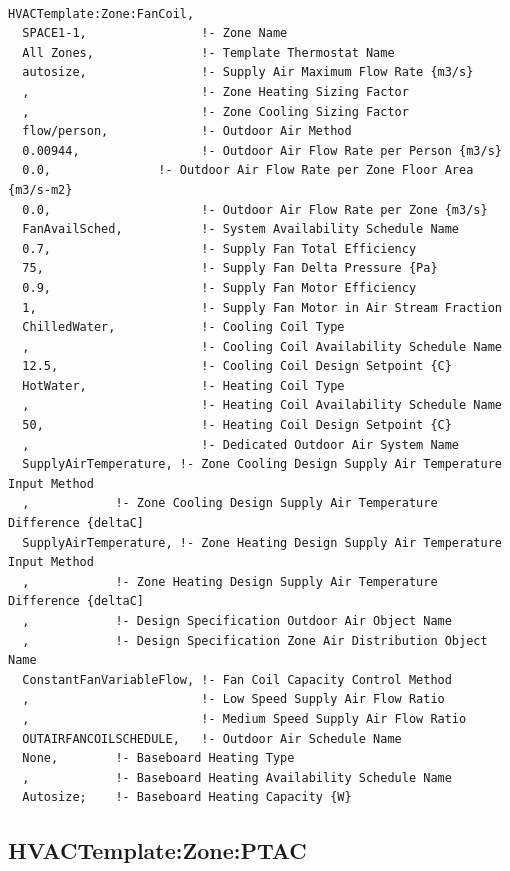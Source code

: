 \begin{lstlisting}

HVACTemplate:Zone:FanCoil,
  SPACE1-1,                !- Zone Name
  All Zones,               !- Template Thermostat Name
  autosize,                !- Supply Air Maximum Flow Rate {m3/s}
  ,                        !- Zone Heating Sizing Factor
  ,                        !- Zone Cooling Sizing Factor
  flow/person,             !- Outdoor Air Method
  0.00944,                 !- Outdoor Air Flow Rate per Person {m3/s}
  0.0,               !- Outdoor Air Flow Rate per Zone Floor Area {m3/s-m2}
  0.0,                     !- Outdoor Air Flow Rate per Zone {m3/s}
  FanAvailSched,           !- System Availability Schedule Name
  0.7,                     !- Supply Fan Total Efficiency
  75,                      !- Supply Fan Delta Pressure {Pa}
  0.9,                     !- Supply Fan Motor Efficiency
  1,                       !- Supply Fan Motor in Air Stream Fraction
  ChilledWater,            !- Cooling Coil Type
  ,                        !- Cooling Coil Availability Schedule Name
  12.5,                    !- Cooling Coil Design Setpoint {C}
  HotWater,                !- Heating Coil Type
  ,                        !- Heating Coil Availability Schedule Name
  50,                      !- Heating Coil Design Setpoint {C}
  ,                        !- Dedicated Outdoor Air System Name
  SupplyAirTemperature, !- Zone Cooling Design Supply Air Temperature Input Method
  ,            !- Zone Cooling Design Supply Air Temperature Difference {deltaC]
  SupplyAirTemperature, !- Zone Heating Design Supply Air Temperature Input Method
  ,            !- Zone Heating Design Supply Air Temperature Difference {deltaC]
  ,            !- Design Specification Outdoor Air Object Name
  ,            !- Design Specification Zone Air Distribution Object Name
  ConstantFanVariableFlow, !- Fan Coil Capacity Control Method
  ,                        !- Low Speed Supply Air Flow Ratio
  ,                        !- Medium Speed Supply Air Flow Ratio
  OUTAIRFANCOILSCHEDULE,   !- Outdoor Air Schedule Name
  None,        !- Baseboard Heating Type
  ,            !- Baseboard Heating Availability Schedule Name
  Autosize;    !- Baseboard Heating Capacity {W}
\end{lstlisting}

\subsection{HVACTemplate:Zone:PTAC}\label{hvactemplatezoneptac}

